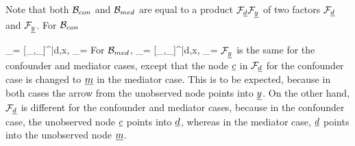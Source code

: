 Note that both ${\cal B}_{con}$ and ${\cal B}_{med}$
are equal to a product 
${\cal F}_{\underline{d}}{\cal F}_{\underline{y}}$ of two
factors ${\cal F}_{\underline{d}}$ and ${\cal F}_{\underline{y}}$.
For ${\cal B}_{con}$

\beq
\calf_\rvy = [\rho_{\rvy,\rvc}\s_\rvy]^{|d,x},
\quad \calf_\rvd =
\eeq
For ${\cal B}_{med}$, 
\beq
\calf_\rvy = [\rho_{\rvy,\rvm}\s_\rvy]^{|d,x},
\quad
\calf_\rvd =
\eeq
${\cal F}_{\underline{y}}$ is the same
for the confounder and mediator cases, except that the node ${\underline{c}}$ in ${\cal F}_{\underline{d}}$ 
for the confounder case is changed to ${\underline{m}}$ in the mediator case. This is to be expected, because 
in both cases the arrow from
the unobserved node points into
${\underline{y}}$.
On the other hand,
${\cal F}_{\underline{d}}$ is different
for the confounder and mediator cases,
because in the confounder case, the unobserved node ${\underline{c}}$ points into ${\underline{d}}$,
whereas  in the mediator case,
${\underline{d}}$ points into the unobserved node ${\underline{m}}$.



